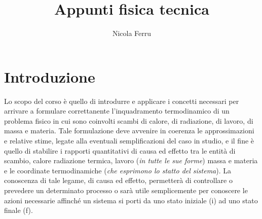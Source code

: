 \documentclass{book}
\title{Appunti fisica tecnica}
\author{Nicola Ferru}
\begin{document}
\maketitle
\chapter{Introduzione \label{intro}}
Lo scopo del corso è quello di introdurre e applicare i concetti necessari per arrivare a formulare
correttanente l'inquadramento termodinamico di un problema fisico in cui sono coinvolti scambi di calore, di
radiazione, di lavoro, di massa e materia. Tale formulazione deve avvenire in coerenza le approssimazioni e
relative stime, legate alla eventuali semplificazioni del caso in studio, e il fine è quello di stabilire
i rapporti quantitativi di causa ed effetto tra le entità di scambio, calore radiazione termica, lavoro
({\it in tutte le sue forme}) massa e materia e le coordinate termodinamiche ({\it che esprimono lo statto del
  sistema}). La conoscenza di tale legame, di causa ed effetto, permetterà di controllare o prevedere un
determinato processo o sarà utile semplicemente per conoscere le azioni necessarie affinché un sistema si
porti da uno stato iniziale (i) ad uno stato finale (f). 
\end{document}
